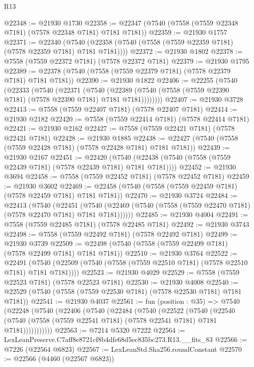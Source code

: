 \begin{lexlean}{R13}
\begin{coremodule}
@22348 := @21930 @1730
@22358 := @22347 (@7540 (@7558 (@7559 @22348 @7181) (@7578 @22348 @7181) @7181 @7181))
@22359 := @21930 @1757
@22371 := @22340
    (@7540 (@22358 (@7540 (@7558 (@7559 @22359 @7181) (@7578 @22359 @7181) @7181 @7181))))
@22372 := @21930 @1802
@22378 := @7558 (@7559 @22372 @7181) (@7578 @22372 @7181)
@22379 := @21930 @1795
@22389 := @22378 (@7540 (@7558 (@7559 @22379 @7181) (@7578 @22379 @7181) @7181 @7181))
@22390 := @21930 @1822
@22406 := @22255
    (@7540
      (@22333
        (@7540
          (@22371
            (@7540
              (@22389 (@7540 (@7558 (@7559 @22390 @7181) (@7578 @22390 @7181) @7181 @7181))))))))
@22407 := @21930 @3728
@22413 := @7558 (@7559 @22407 @7181) (@7578 @22407 @7181)
@22414 := @21930 @2182
@22420 := @7558 (@7559 @22414 @7181) (@7578 @22414 @7181)
@22421 := @21930 @2162
@22427 := @7558 (@7559 @22421 @7181) (@7578 @22421 @7181)
@22428 := @21930 @1885
@22438 := @22427 (@7540 (@7558 (@7559 @22428 @7181) (@7578 @22428 @7181) @7181 @7181))
@22439 := @21930 @2167
@22451 := @22420
    (@7540 (@22438 (@7540 (@7558 (@7559 @22439 @7181) (@7578 @22439 @7181) @7181 @7181))))
@22452 := @21930 @3694
@22458 := @7558 (@7559 @22452 @7181) (@7578 @22452 @7181)
@22459 := @21930 @3602
@22469 := @22458 (@7540 (@7558 (@7559 @22459 @7181) (@7578 @22459 @7181) @7181 @7181))
@22470 := @21930 @3724
@22484 := @22413
    (@7540
      (@22451
        (@7540 (@22469 (@7540 (@7558 (@7559 @22470 @7181) (@7578 @22470 @7181) @7181 @7181))))))
@22485 := @21930 @4004
@22491 := @7558 (@7559 @22485 @7181) (@7578 @22485 @7181)
@22492 := @21930 @3743
@22498 := @7558 (@7559 @22492 @7181) (@7578 @22492 @7181)
@22499 := @21930 @3739
@22509 := @22498 (@7540 (@7558 (@7559 @22499 @7181) (@7578 @22499 @7181) @7181 @7181))
@22510 := @21930 @3764
@22522 := @22491
    (@7540 (@22509 (@7540 (@7558 (@7559 @22510 @7181) (@7578 @22510 @7181) @7181 @7181))))
@22523 := @21930 @4029
@22529 := @7558 (@7559 @22523 @7181) (@7578 @22523 @7181)
@22530 := @21930 @4008
@22540 := @22529 (@7540 (@7558 (@7559 @22530 @7181) (@7578 @22530 @7181) @7181 @7181))
@22541 := @21930 @4037
@22561 := fun (position : @35) =>
  @7540
    (@22248
      (@7540
        (@22406
          (@7540
            (@22484
              (@7540
                (@22522
                  (@7540
                    (@22540
                      (@7540 (@7558 (@7559 @22541 @7181) (@7578 @22541 @7181) @7181 @7181)))))))))))
@22563 := @7214 @5320 @7222
@22564 := LexLeanPreserve.C7aff8e8721cf8b4dfe68d5ec835bc273.R13.__fits_83
@22566 := @7226 (@22564 @6823)
@22567 := LexLeanStd.Sha256.roundConstant
@22570 := @22566 (@4460 (@22567 @6823))

\end{coremodule}
\end{lexlean}
